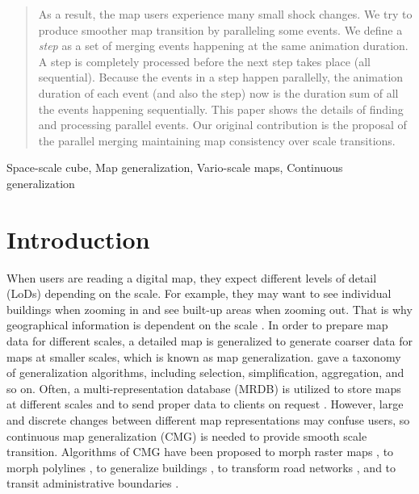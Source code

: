 \documentclass[]{interact}
\begin{document}
\begin{abstract}
As a result, the map users experience many small shock changes.
We try to produce smoother map transition by paralleling some events.
We define a \emph{step} as a set of merging events happening 
at the same animation duration.
A step is completely processed 
before the next step takes place (all sequential).
Because the events in a step happen parallelly,
the animation duration of each event (and also the step) now is 
the duration sum of all the events happening sequentially. 
This paper shows the details of finding and processing parallel events.
Our original contribution is the proposal of the parallel merging
maintaining map consistency over scale transitions. 
\end{abstract}

\begin{keywords}
Space-scale cube, Map generalization, Vario-scale maps, Continuous generalization
\end{keywords}


\section{Introduction}

When users are reading a digital map,
they expect different levels of detail (LoDs) depending on the scale.
For example, they may want to see individual buildings when zooming in
and see built-up areas when zooming out.
That is why geographical information is dependent on the scale
\citep{Muller1995Generalization,Weibel1997}. 
In order to prepare map data for different scales,
a detailed map is generalized to generate coarser data 
for maps at smaller scales,
which is known as map generalization.
\citet{Mackaness2017Generalization} gave a taxonomy of 
generalization algorithms, 
including selection, simplification, aggregation, and so on.
Often, a multi-representation database (MRDB) is utilized to store
maps at different scales and to send proper data to clients on request
\citep[\eg][]{Hampe2004multiple}.
However, large and discrete changes between different map representations
may confuse users,
so continuous map generalization (CMG) is needed to
provide smooth scale transition.
Algorithms of CMG have been proposed 
to morph raster maps
\citep[\eg][]{Pantazis2009a,Pantazis2009b}, 
to morph polylines
\citep[\eg][]{Noellenburg2008,Peng2013LSA,Deng2015,Li2017Annealing},
to generalize buildings
\citep[\eg][]{Li2017_Building,Peng2017Building,Touya2017Progressive},
to transform road networks
\citep[\eg][]{Suba2016Road,Chimani2014Eat},
and to transit administrative boundaries
\citep[\eg][]{Peng2016Admin}.
\end{document}
